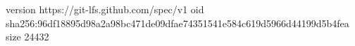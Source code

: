 version https://git-lfs.github.com/spec/v1
oid sha256:96df18895d98a2a98bc471de09dfae74351541e584c619d5966d44199d5b4fea
size 24432
